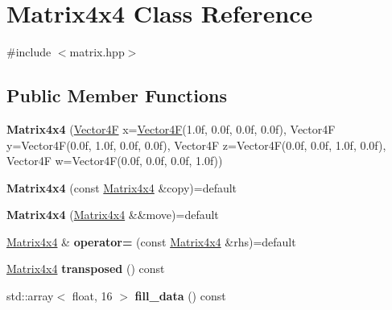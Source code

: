 \hypertarget{class_matrix4x4}{}\section{Matrix4x4 Class Reference}
\label{class_matrix4x4}


{\ttfamily \#include $<$matrix.\+hpp$>$}

\subsection*{Public Member Functions}
\begin{DoxyCompactItemize}
\item 
\mbox{\label{class_matrix4x4_a39b2fece91eb5a25334e107ea782b1ba}} 
{\bfseries Matrix4x4} (\mbox{\hyperlink{class_vector4}{Vector4F}} x=\mbox{\hyperlink{class_vector4}{Vector4F}}(1.\+0f, 0.\+0f, 0.\+0f, 0.\+0f), Vector4\+F y=\+Vector4\+F(0.\+0f, 1.\+0f, 0.\+0f, 0.\+0f), Vector4\+F z=\+Vector4\+F(0.\+0f, 0.\+0f, 1.\+0f, 0.\+0f), Vector4\+F w=\+Vector4\+F(0.\+0f, 0.\+0f, 0.\+0f, 1.\+0f))
\item 
\mbox{\label{class_matrix4x4_aae4a405c8eb50e755a05394bc9533ce1}} 
{\bfseries Matrix4x4} (const \mbox{\hyperlink{class_matrix4x4}{Matrix4x4}} \&copy)=default
\item 
\mbox{\label{class_matrix4x4_a8254f94aef2225780b45990b9ad7a70e}} 
{\bfseries Matrix4x4} (\mbox{\hyperlink{class_matrix4x4}{Matrix4x4}} \&\&move)=default
\item 
\mbox{\label{class_matrix4x4_a4d50c1b0b7fcec8bb2cc748ae07a845b}} 
\mbox{\hyperlink{class_matrix4x4}{Matrix4x4}} \& {\bfseries operator=} (const \mbox{\hyperlink{class_matrix4x4}{Matrix4x4}} \&rhs)=default
\item 
\mbox{\label{class_matrix4x4_a55a81c0c40a8ff637066cfd570f8bc3b}} 
\mbox{\hyperlink{class_matrix4x4}{Matrix4x4}} {\bfseries transposed} () const
\item 
\mbox{\label{class_matrix4x4_a4f0f6e979fc19b3c145eed59ed68b6b5}} 
std\+::array$<$ float, 16 $>$ {\bfseries fill\+\_\+data} () const
\item 
\mbox{\label{class_matrix4x4_a1e7d1651d27e62b343ac76eee98ca3c4}} 

\end{DoxyCompactItemize}
